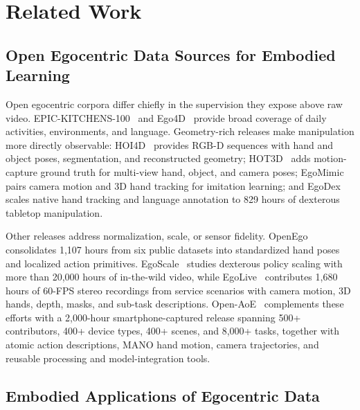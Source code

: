 \section{Related Work}

\subsection{Open Egocentric Data Sources for Embodied Learning}

Open egocentric corpora differ chiefly in the supervision they expose above raw video. EPIC-KITCHENS-100~\cite{damen2022rescaling} and Ego4D~\cite{grauman2022ego4d} provide broad coverage of daily activities, environments, and language. Geometry-rich releases make manipulation more directly observable: HOI4D~\cite{liu2022hoi4d} provides RGB-D sequences with hand and object poses, segmentation, and reconstructed geometry; HOT3D~\cite{banerjee2025hot3d} adds motion-capture ground truth for multi-view hand, object, and camera poses; EgoMimic~\cite{kareer2024egomimic} pairs camera motion and 3D hand tracking for imitation learning; and EgoDex~\cite{egodex2025} scales native hand tracking and language annotation to 829 hours of dexterous tabletop manipulation.

Other releases address normalization, scale, or sensor fidelity. OpenEgo~\cite{openegocentric2025} consolidates 1,107 hours from six public datasets into standardized hand poses and localized action primitives. EgoScale~\cite{egoscale2026} studies dexterous policy scaling with more than 20,000 hours of in-the-wild video, while EgoLive~\cite{egolive2026} contributes 1,680 hours of 60-FPS stereo recordings from service scenarios with camera motion, 3D hands, depth, masks, and sub-task descriptions. Open-AoE~\cite{aoe2026} complements these efforts with a 2,000-hour smartphone-captured release spanning 500+ contributors, 400+ device types, 400+ scenes, and 8,000+ tasks, together with atomic action descriptions, MANO hand motion, camera trajectories, and reusable processing and model-integration tools.

\subsection{Embodied Applications of Egocentric Data}

